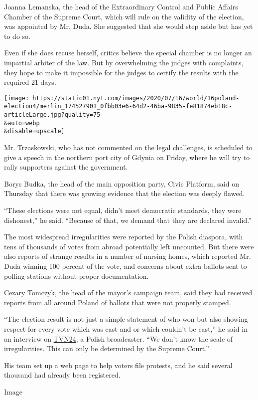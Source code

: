 Joanna Lemanska, the head of the Extraordinary Control and Public
Affairs Chamber of the Supreme Court, which will rule on the validity of
the election, was appointed by Mr. Duda. She suggested that she would
step aside but has yet to do so.

Even if she does recuse herself, critics believe the special chamber is
no longer an impartial arbiter of the law. But by overwhelming the
judges with complaints, they hope to make it impossible for the judges
to certify the results with the required 21 days.

\texttt{[image: https://static01.nyt.com/images/2020/07/16/world/16poland-election4/merlin\_174527901\_0fbb03e6-64d2-46ba-9835-fe81874eb18c-articleLarge.jpg?quality=75\\\&auto=webp\\\&disable=upscale]}

Mr. Trzaskowski, who has not commented on the legal challenges, is
scheduled to give a speech in the northern port city of Gdynia on
Friday, where he will try to rally supporters against the government.

Borys Budka, the head of the main opposition party, Civic Platform, said
on Thursday that there was growing evidence that the election was deeply
flawed.

``These elections were not equal, didn't meet democratic standards, they
were dishonest,'' he said. ``Because of that, we demand that they are
declared invalid.''

The most widespread irregularities were reported by the Polish diaspora,
with tens of thousands of votes from abroad potentially left uncounted.
But there were also reports of strange results in a number of nursing
homes, which reported Mr. Duda winning 100 percent of the vote, and
concerns about extra ballots sent to polling stations without proper
documentation.

Cezary Tomczyk, the head of the mayor's campaign team, said they had
received reports from all around Poland of ballots that were not
properly stamped.

``The election result is not just a simple statement of who won but also
showing respect for every vote which was cast and or which couldn't be
cast,'' he said in an interview on \href{https://tvn24.pl/}{TVN24,} a
Polish broadcaster. ``We don't know the scale of irregularities. This
can only be determined by the Supreme Court.''

His team set up a web page to help voters file protests, and he said
several thousand had already been registered.

Image

